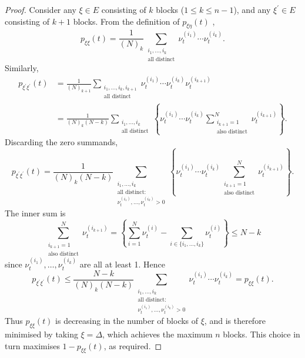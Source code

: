 \begin{proof}
Consider any $\xi \in E$ consisting of $k$ blocks ($1\leq k\leq n-1$), and any $\xi^\prime\in E$ consisting of $k+1$ blocks. 
From the definition of $p_{\xi\eta}(t)$ \parencite[Equation (1)]{koskela2018},
\begin{equation*}
p_{\xi\xi}(t) 
= \frac{1}{(N)_k} \sum_{\substack{i_1,\dots,i_k \\ \text{all distinct}}} 
        \nu_t^{(i_1)} \cdots \nu_t^{(i_k)} .
\end{equation*}
Similarly,
\begin{align*}
p_{\xi^\prime\xi^\prime}(t) &= \frac{1}{(N)_{k+1}} 
        \sum_{\substack{i_1,\dots,i_k, i_{k+1} \\ \text{all distinct}}} 
        \nu_t^{(i_1)} \cdots \nu_t^{(i_k)} \nu_t^{(i_{k+1})} \\
&= \frac{1}{(N)_k(N-k)} \sum_{\substack{i_1,\dots,i_k \\ \text{all distinct}}} 
        \left\{ \nu_t^{(i_1)} \cdots \nu_t^{(i_k)} 
        \sum_{\substack{i_{k+1}=1 \\ \text{also distinct}}}^N 
        \nu_t^{(i_{k+1})} \right\} .
\end{align*}
Discarding the zero summands,
\begin{equation*}
p_{\xi^\prime\xi^\prime}(t) 
= \frac{1}{(N)_k(N-k)} \sum_{\substack{i_1,\dots,i_k \\ \text{all distinct:} \\
        \nu_t^{(i_1)},\dots,\nu_t^{(i_k)} > 0 }} 
        \left\{ \nu_t^{(i_1)} \cdots \nu_t^{(i_k)} 
        \sum_{\substack{i_{k+1}=1 \\ 
        \text{also distinct}}}^N \nu_t^{(i_{k+1})} \right\} .
\end{equation*}
The inner sum is
\begin{equation*}
\sum_{\substack{i_{k+1}=1 \\ \text{also distinct}}}^N \nu_t^{(i_{k+1})} 
= \left\{ \sum_{i=1}^N \nu_t^{(i)} -  \sum_{i\in\{i_1,\dots,i_k\} } 
        \nu_t^{(i)} \right\}
\leq N - k
\end{equation*}
since $\nu_t^{(i_1)},\dots,\nu_t^{(i_k)} $ are all at least 1.
Hence
\begin{equation*}
p_{\xi^\prime\xi^\prime}(t)
\leq  \frac{N-k}{(N)_k(N-k)} \sum_{\substack{i_1,\dots,i_k \\ \text{all distinct:} \\ \nu_t^{(i_1)},\dots,\nu_t^{(i_k)} > 0 }} \nu_t^{(i_1)} \cdots \nu_t^{(i_k)} 
= p_{\xi\xi}(t) .
\end{equation*}
Thus $p_{\xi\xi}(t)$ is decreasing in the number of blocks of $\xi$, and is therefore minimised by taking $\xi = \Delta$, which achieves the maximum $n$ blocks. This choice in turn maximises $1-p_{\xi\xi}(t)$, as required.
\end{proof}




